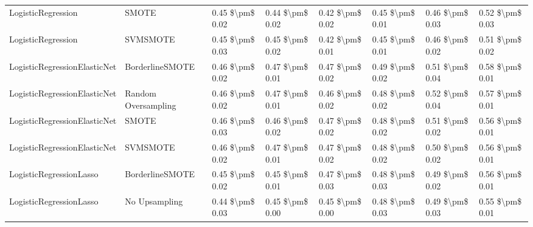 \begin{tabular}{llllllll}
             LogisticRegression &                         SMOTE & 0.45 \$\textbackslash pm\$ 0.02 &           0.44 \$\textbackslash pm\$ 0.02 &       0.42 \$\textbackslash pm\$ 0.02 &        0.45 \$\textbackslash pm\$ 0.01 &                         0.46 \$\textbackslash pm\$ 0.03 &     0.52 \$\textbackslash pm\$ 0.03 \\
             LogisticRegression &                      SVMSMOTE & 0.45 \$\textbackslash pm\$ 0.03 &           0.45 \$\textbackslash pm\$ 0.02 &       0.42 \$\textbackslash pm\$ 0.01 &        0.45 \$\textbackslash pm\$ 0.01 &                         0.46 \$\textbackslash pm\$ 0.02 &     0.51 \$\textbackslash pm\$ 0.02 \\
   LogisticRegressionElasticNet &               BorderlineSMOTE & 0.46 \$\textbackslash pm\$ 0.02 &           0.47 \$\textbackslash pm\$ 0.01 &       0.47 \$\textbackslash pm\$ 0.02 &        0.49 \$\textbackslash pm\$ 0.02 &                         0.51 \$\textbackslash pm\$ 0.04 &     0.58 \$\textbackslash pm\$ 0.01 \\
   LogisticRegressionElasticNet &           Random Oversampling & 0.46 \$\textbackslash pm\$ 0.02 &           0.47 \$\textbackslash pm\$ 0.01 &       0.46 \$\textbackslash pm\$ 0.02 &        0.48 \$\textbackslash pm\$ 0.02 &                         0.52 \$\textbackslash pm\$ 0.04 &     0.57 \$\textbackslash pm\$ 0.01 \\
   LogisticRegressionElasticNet &                         SMOTE & 0.46 \$\textbackslash pm\$ 0.03 &           0.46 \$\textbackslash pm\$ 0.02 &       0.47 \$\textbackslash pm\$ 0.02 &        0.48 \$\textbackslash pm\$ 0.02 &                         0.51 \$\textbackslash pm\$ 0.02 &     0.56 \$\textbackslash pm\$ 0.01 \\
   LogisticRegressionElasticNet &                      SVMSMOTE & 0.46 \$\textbackslash pm\$ 0.02 &           0.47 \$\textbackslash pm\$ 0.01 &       0.47 \$\textbackslash pm\$ 0.02 &        0.48 \$\textbackslash pm\$ 0.02 &                         0.50 \$\textbackslash pm\$ 0.02 &     0.56 \$\textbackslash pm\$ 0.01 \\
        LogisticRegressionLasso &               BorderlineSMOTE & 0.45 \$\textbackslash pm\$ 0.02 &           0.45 \$\textbackslash pm\$ 0.01 &       0.47 \$\textbackslash pm\$ 0.03 &        0.48 \$\textbackslash pm\$ 0.03 &                         0.49 \$\textbackslash pm\$ 0.02 &     0.56 \$\textbackslash pm\$ 0.01 \\
        LogisticRegressionLasso &                 No Upsampling & 0.44 \$\textbackslash pm\$ 0.03 &           0.45 \$\textbackslash pm\$ 0.00 &       0.45 \$\textbackslash pm\$ 0.00 &        0.48 \$\textbackslash pm\$ 0.03 &                         0.49 \$\textbackslash pm\$ 0.03 &     0.55 \$\textbackslash pm\$ 0.01 \\

\end{tabular}
